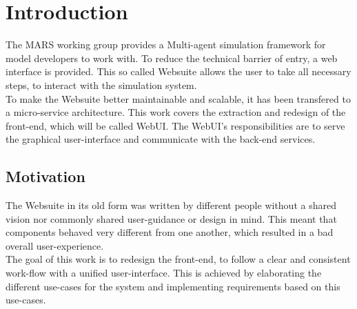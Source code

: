 
\chapter{Introduction}
The MARS working group provides a Multi-agent simulation framework for model developers to work with. To reduce the technical barrier of entry, a web interface is provided. This  so called Websuite allows the user to take all necessary steps, to interact with the simulation system.\\
To make the Websuite better maintainable and scalable, it has been transfered to a micro-service architecture. This work covers the extraction and redesign of the front-end, which will be called WebUI. The WebUI's responsibilities are to serve the graphical user-interface and communicate with the back-end services.


\section{Motivation}
The Websuite in its old form was written by different people without a shared vision nor commonly shared user-guidance or design in mind. This meant that components behaved very different from one another, which resulted in a bad overall user-experience.\\
The goal of this work is to redesign the front-end, to follow a clear and consistent work-flow with a unified user-interface. This is achieved by elaborating the different use-cases for the system and implementing requirements based on this use-cases.